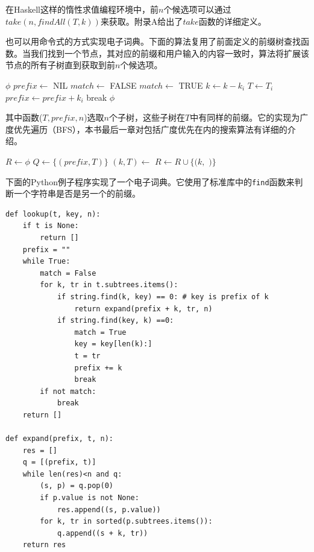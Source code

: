 \documentclass[b5paper]{ctexart}
\begin{document}
在Haskell这样的惰性求值编程环境中，前$n$个候选项可以通过$take(n, findAll(T, k))$来获取。附录A给出了$take$函数的详细定义。

也可以用命令式的方式实现电子词典。下面的算法复用了前面定义的前缀树查找函数。当我们找到一个节点，其对应的前缀和用户输入的内容一致时，算法将扩展该节点的所有子树直到获取到前$n$个候选项。

\begin{algorithmic}[1]
     \State \Return $\phi$
  \EndIf
  \State $prefix \gets$ NIL
  \Repeat
    \State $match \gets$ FALSE
        \State \Return {}
      \EndIf
        \State $match \gets$ TRUE
        \State $k \gets k - k_i$
        \State $T \gets T_i$
        \State $prefix \gets prefix + k_i$
        \State break
      \EndIf
    \EndFor
  \State \Return $\phi$
\EndFunction
\end{algorithmic}

其中函数($T, prefix, n$)选取$n$个子树，这些子树在$T$中有同样的前缀。它的实现为广度优先遍历（BFS），本书最后一章对包括广度优先在内的搜索算法有详细的介绍。

\begin{algorithmic}[1]
  \State $R \gets \phi$
  \State $Q \gets \{(prefix, T)\}$
    \State $(k, T) \gets$ 
      \State $R \gets R \cup \{(k, $  $)\}$
    \EndIf
      \State {}
    \EndFor
  \EndWhile
\EndFunction
\end{algorithmic}

下面的Python例子程序实现了一个电子词典。它使用了标准库中的\texttt{find}函数来判断一个字符串是否是另一个的前缀。

\lstset{language=Python}
\begin{lstlisting}
def lookup(t, key, n):
    if t is None:
        return []
    prefix = ""
    while True:
        match = False
        for k, tr in t.subtrees.items():
            if string.find(k, key) == 0: # key is prefix of k
                return expand(prefix + k, tr, n)
            if string.find(key, k) ==0:
                match = True
                key = key[len(k):]
                t = tr
                prefix += k
                break
        if not match:
            break
    return []

def expand(prefix, t, n):
    res = []
    q = [(prefix, t)]
    while len(res)<n and q:
        (s, p) = q.pop(0)
        if p.value is not None:
            res.append((s, p.value))
        for k, tr in sorted(p.subtrees.items()):
            q.append((s + k, tr))
    return res
\end{lstlisting}
\end{document}

